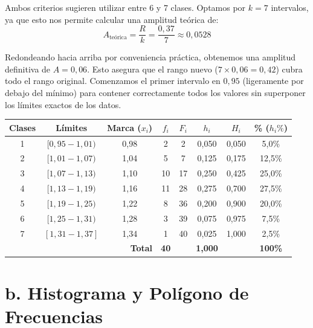 \documentclass[12pt, a4paper]{article}
\begin{document}
Ambos criterios sugieren utilizar entre 6 y 7 clases. Optamos por $k=7$ intervalos, ya que esto nos permite calcular una amplitud teórica de:
\[ A_{\text{teórica}} = \frac{R}{k} = \frac{0,37}{7} \approx 0,0528 \]

Redondeando hacia arriba por conveniencia práctica, obtenemos una amplitud definitiva de $A = 0,06$. Esto asegura que el rango nuevo ($7 \times 0,06 = 0,42$) cubra todo el rango original. Comenzamos el primer intervalo en $0,95$ (ligeramente por debajo del mínimo) para contener correctamente todos los valores sin superponer los límites exactos de los datos.

\begin{table}[h]
\centering
\begin{tabular}{cccccccc}
\toprule
\textbf{Clases} & \textbf{Límites} & \textbf{Marca ($x_i$)} & \textbf{$f_i$} & \textbf{$F_i$} & \textbf{$h_i$} & \textbf{$H_i$} & \textbf{\%} ($h_i\%$) \\
\midrule
1 & $[0,95 - 1,01)$ & 0,98 & 2 & 2 & 0,050 & 0,050 & 5,0\% \\
2 & $[1,01 - 1,07)$ & 1,04 & 5 & 7 & 0,125 & 0,175 & 12,5\% \\
3 & $[1,07 - 1,13)$ & 1,10 & 10 & 17 & 0,250 & 0,425 & 25,0\% \\
4 & $[1,13 - 1,19)$ & 1,16 & 11 & 28 & 0,275 & 0,700 & 27,5\% \\
5 & $[1,19 - 1,25)$ & 1,22 & 8 & 36 & 0,200 & 0,900 & 20,0\% \\
6 & $[1,25 - 1,31)$ & 1,28 & 3 & 39 & 0,075 & 0,975 & 7,5\% \\
7 & $[1,31 - 1,37]$ & 1,34 & 1 & 40 & 0,025 & 1,000 & 2,5\% \\
\midrule
\multicolumn{3}{r}{\textbf{Total}} & \textbf{40} & & \textbf{1,000} & & \textbf{100\%} \\
\bottomrule
\end{tabular}
\end{table}

\newpage
\section*{b. Histograma y Polígono de Frecuencias}
\end{document}
